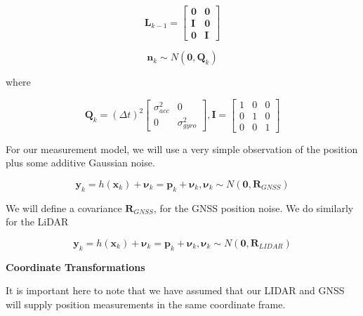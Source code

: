 \begin{equation}
\mathbf{L}_{k-1} = 
\begin{bmatrix}
\mathbf{0} & \mathbf{0} \\
\mathbf{I} & \mathbf{0}  \\
\mathbf{0} & \mathbf{I} 
\end{bmatrix}
\end{equation}

\begin{equation}
\mathbf{n}_{k} \sim N(\mathbf{0}, \mathbf{Q}_k) 
\end{equation}

where

\begin{equation}
\mathbf{Q}_{k} = (\Delta t)^2
\begin{bmatrix}
\sigma_{acc}^2 & 0  \\
0 & \sigma_{gyro}^2 
\end{bmatrix},
\mathbf{I} =
\begin{bmatrix}
1 &  0 & 0 \\
0 &  1 & 0 \\
0 &  0 & 1  
\end{bmatrix}
\end{equation}

For our measurement model, we will use a very
simple observation of the position plus some additive Gaussian noise. 

\begin{equation}
\mathbf{y}_k = h(\mathbf{x}_k) + \boldsymbol{\nu}_k = \mathbf{p}_k + \boldsymbol{\nu}_k, \boldsymbol{\nu}_k \sim N(\mathbf{0}, \mathbf{R}_{GNSS})
\end{equation}

We will define a covariance $\mathbf{R}_{GNSS}$, for the GNSS
position noise. We do similarly for the LiDAR

\begin{equation}
\mathbf{y}_k = h(\mathbf{x}_k) + \boldsymbol{\nu}_k = \mathbf{p}_k + \boldsymbol{\nu}_k, \boldsymbol{\nu}_k \sim N(\mathbf{0}, \mathbf{R}_{LIDAR})
\end{equation}

\begin{framed}
\theoremstyle{remark}
\begin{remark}{\textbf{Coordinate Transformations}}

It is important here
to note that we have assumed that our LIDAR and GNSS will supply
position measurements in the same
coordinate frame. 
\end{remark}
\end{framed}

